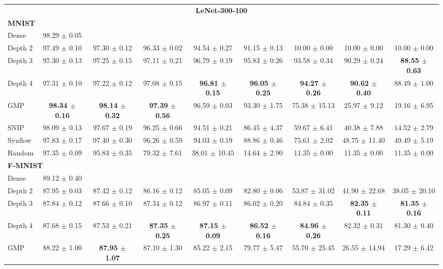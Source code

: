 \begin{table}[b]
{\begin{tabular}{lcccccccc}
\hline
\multicolumn{9}{c}{\textbf{LeNet-300-100}} \\
\multicolumn{9}{l}{\textbf{MNIST}} \\
Dense & 98.29 $\pm$ 0.05 \\
Depth 2 & 97.49 $\pm$ 0.10 & 97.30 $\pm$ 0.12 & 96.33 $\pm$ 0.02 & 94.54 $\pm$ 0.27 & 91.15 $\pm$ 0.13 & 10.00 $\pm$ 0.00 & 10.00 $\pm$ 0.00 & 10.00 $\pm$ 0.00 \\
Depth 3 & 97.30 $\pm$ 0.13 & 97.25 $\pm$ 0.15 & 97.11 $\pm$ 0.21 & 96.79 $\pm$ 0.19 & 95.83 $\pm$ 0.26 & 93.58 $\pm$ 0.34 & 90.29 $\pm$ 0.24 & \textbf{88.55 $\pm$ 0.63} \\
Depth 4 & 97.31 $\pm$ 0.10 & 97.22 $\pm$ 0.12 & 97.08 $\pm$ 0.15 & \textbf{96.81 $\pm$ 0.15} & \textbf{96.05 $\pm$ 0.25} & \textbf{94.27 $\pm$ 0.26} & \textbf{90.62 $\pm$ 0.40} & 88.49 $\pm$ 1.00 \\
GMP & \textbf{98.34 $\pm$ 0.16} & \textbf{98.14 $\pm$ 0.32} & \textbf{97.39 $\pm$ 0.56} & 96.59 $\pm$ 0.03 & 93.30 $\pm$ 1.75 & 75.38 $\pm$ 15.13 & 25.97 $\pm$ 9.12 & 19.16 $\pm$ 6.95 \\
SNIP & 98.09 $\pm$ 0.13 & 97.67 $\pm$ 0.19 & 96.25 $\pm$ 0.66 & 94.51 $\pm$ 0.21 & 86.45 $\pm$ 4.37 & 59.67 $\pm$ 6.41 & 40.38 $\pm$ 7.88 & 14.52 $\pm$ 2.79 \\
Synflow & 97.83 $\pm$ 0.17 & 97.40 $\pm$ 0.30 & 96.26 $\pm$ 0.59 & 94.03 $\pm$ 0.19 & 88.86 $\pm$ 0.46 & 75.61 $\pm$ 2.02 & 48.75 $\pm$ 11.40 & 49.49 $\pm$ 5.19 \\
Random & 97.35 $\pm$ 0.09 & 95.83 $\pm$ 0.35 & 79.32 $\pm$ 7.61 & 38.01 $\pm$ 10.45 & 14.64 $\pm$ 2.90 & 11.35 $\pm$ 0.00 & 11.35 $\pm$ 0.00 & 11.35 $\pm$ 0.00 \\
\hline
\multicolumn{9}{l}{\textbf{F-MNIST}} \\
Dense & 89.12 $\pm$ 0.40 \\
Depth 2 & 87.95 $\pm$ 0.03 & 87.42 $\pm$ 0.12 & 86.16 $\pm$ 0.12 & 85.05 $\pm$ 0.09 & 82.80 $\pm$ 0.06 & 53.87 $\pm$ 31.02 & 41.90 $\pm$ 22.68 & 38.05 $\pm$ 20.10 \\
Depth 3 & 87.84 $\pm$ 0.12 & 87.66 $\pm$ 0.10 & 87.34 $\pm$ 0.12 & 86.97 $\pm$ 0.11 & 86.02 $\pm$ 0.20 & 84.84 $\pm$ 0.35 & \textbf{82.35 $\pm$ 0.11} & \textbf{81.35 $\pm$ 0.16} \\
Depth 4 & 87.68 $\pm$ 0.15 & 87.53 $\pm$ 0.21 & \textbf{87.35 $\pm$ 0.25} & \textbf{87.15 $\pm$ 0.09} & \textbf{86.52 $\pm$ 0.16} & \textbf{84.96 $\pm$ 0.26} & 82.32 $\pm$ 0.31 & 81.30 $\pm$ 0.40 \\
GMP & 88.22 $\pm$ 1.00 & \textbf{87.95 $\pm$ 1.07} & 87.10 $\pm$ 1.30 & 85.22 $\pm$ 2.15 & 79.77 $\pm$ 5.47 & 55.70 $\pm$ 25.45 & 26.55 $\pm$ 14.94 & 17.29 $\pm$ 6.42 \\

\end{tabular}}
\end{table}

